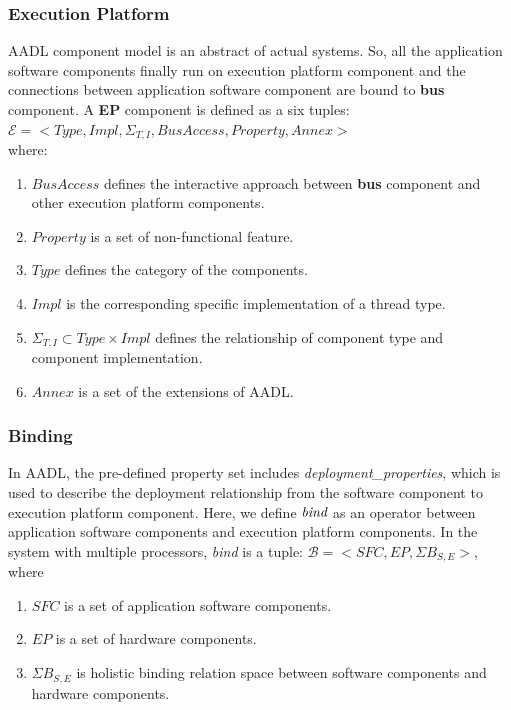 \subsubsection{Execution Platform}
AADL component model is an abstract of actual systems. So, all the application software components finally run on execution platform component and the connections between application software component are bound to \textbf{bus} component.  
 A \textbf{EP} component is defined as a six tuples:\\ $\mathcal{E} = <Type, Impl, \Sigma_{T, I}, BusAccess, Property, Annex>$ \\where: 
\begin{enumerate}
\item $BusAccess$ defines the interactive approach between \textbf{bus} component and other execution platform components.
\item $Property$ is a set of non-functional feature.
\item $Type$ defines the category of the components. 
\item $Impl$ is the corresponding specific implementation of a thread type.
\item $\Sigma_{T, I}\subset Type\times Impl$ defines the relationship of component type and component implementation.
\item $Annex$ is a set of the extensions of AADL.
\end{enumerate} %

\subsubsection{Binding}
In AADL, the pre-defined property set includes \emph{deployment\_properties}, which is used to describe the deployment relationship from the software component to execution platform component. Here, we define $\emph{bind}$ as an operator between application software components and execution platform components. 
 In the system with multiple processors, \emph{bind} is a tuple: $\mathcal{B} = <SFC, EP, \Sigma B_{S,E}>$, where
\begin{enumerate}
\item $SFC$ is a set of application software components.
\item $EP$ is a set of hardware components.
\item $\Sigma B_{S,E}$ is holistic binding relation space between software components and hardware components.
\end{enumerate} %



